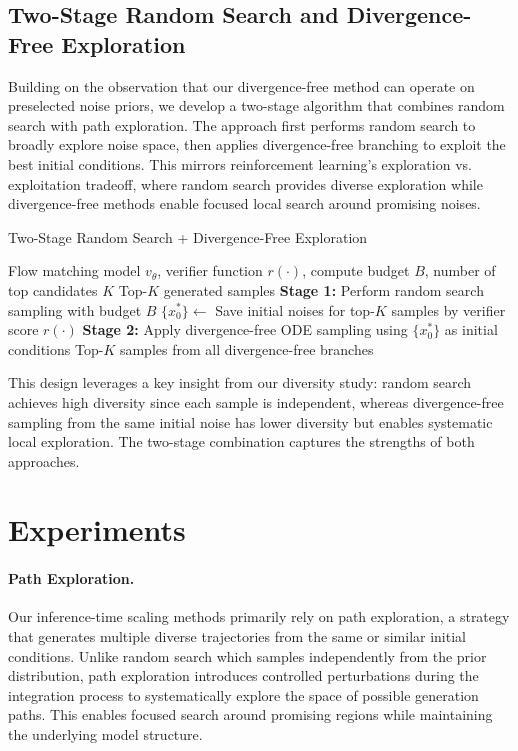 \documentclass{article}
\begin{document}
\subsection{Two-Stage Random Search and Divergence-Free Exploration}
Building on the observation that our divergence-free method can operate on preselected noise priors, we develop a two-stage algorithm that combines random search with path exploration. The approach first performs random search to broadly explore noise space, then applies divergence-free branching to exploit the best initial conditions. This mirrors reinforcement learning's exploration vs. exploitation tradeoff, where random search provides diverse exploration while divergence-free methods enable focused local search around promising noises.

\begin{algorithm}[H]
\caption{Two-Stage Random Search + Divergence-Free Exploration}
\label{alg:two-stage-sampling}
\begin{algorithmic}[1]
\Require Flow matching model $v_\theta$, verifier function $r(\cdot)$, compute budget $B$, number of top candidates $K$
\Ensure Top-$K$ generated samples
\State \textbf{Stage 1:} Perform random search sampling with budget $B$
\State $\{x_0^*\} \leftarrow$ Save initial noises for top-$K$ samples by verifier score $r(\cdot)$
\State \textbf{Stage 2:} Apply divergence-free ODE sampling using $\{x_0^*\}$ as initial conditions
\State \Return Top-$K$ samples from all divergence-free branches
\end{algorithmic}
\end{algorithm}

This design leverages a key insight from our diversity study: random search achieves high diversity since each sample is independent, whereas divergence-free sampling from the same initial noise has lower diversity but enables systematic local exploration. The two-stage combination captures the strengths of both approaches.


\section{Experiments}

\paragraph{Path Exploration.}
Our inference-time scaling methods primarily rely on path exploration, a strategy that generates multiple diverse trajectories from the same or similar initial conditions. Unlike random search which samples independently from the prior distribution, path exploration introduces controlled perturbations during the integration process to systematically explore the space of possible generation paths. This enables focused search around promising regions while maintaining the underlying model structure.
\end{document}
